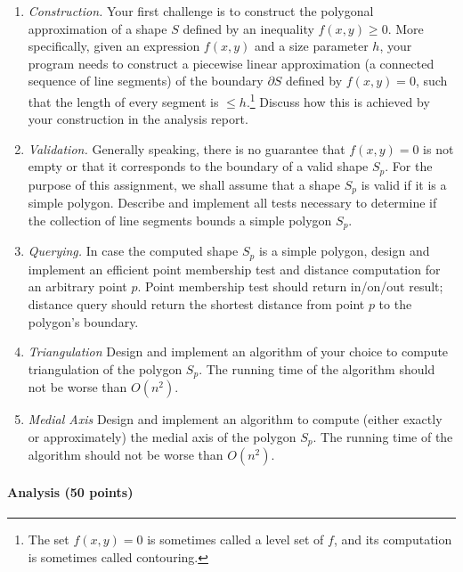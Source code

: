 \documentclass[11pt]{article}
\begin{document}
\begin{enumerate}
\item {\em Construction.}
Your first challenge is to construct the polygonal approximation of a shape $S$ defined by an inequality $f(x,y) \ge 0.$   More specifically,  given an expression $f(x,y)$ and a size parameter $h$,  your program needs to  construct  a piecewise linear approximation (a connected sequence of line segments)  of the boundary $\partial S$ defined by  $f(x,y) = 0$, such that the length of every segment is  $\le h$.\footnote{The set $f(x,y) = 0$ is sometimes called a level set of $f$, and its computation is sometimes called contouring.} Discuss how this is achieved by your construction in the analysis report. 

\item {\em Validation.}  Generally speaking,  there is no guarantee that $f(x,y)=0$ is not empty or that it corresponds to the boundary of a valid shape $S_p$.  For the purpose of this assignment, we shall assume that a shape $S_p$ is valid if it is a simple polygon.  Describe and implement all tests necessary to determine if the collection of line segments bounds a simple polygon $S_p$.  

\item {\em Querying.}  In case the computed shape $S_p$ is a simple polygon, design and implement an efficient point membership test and distance computation for an arbitrary point $p$.   Point membership test should return in/on/out result;  distance query should return the shortest distance from point $p$ to the polygon's boundary.

\item {\em Triangulation}
Design and implement an algorithm of your choice to compute triangulation of the polygon $S_p$.  The running time of the algorithm should not be worse than $O(n^2)$.

\item {\em Medial Axis}
Design and implement an algorithm to compute (either exactly or approximately) the medial axis of the polygon $S_p$.  The running time of the algorithm should not be worse than $O(n^2)$. 

\end{enumerate}



\paragraph { Analysis (50 points)}
\end{document}
